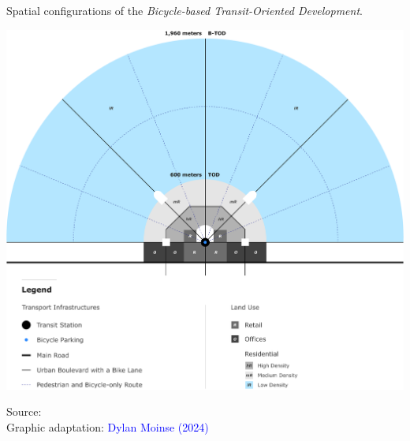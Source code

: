 \begin{refsegment}
\begin{carte}[h!]\vspace*{4pt}
    \caption{Spatial configurations of the \textsl{Bicycle-based Transit-Oriented Development}.}
    \label{fig-chap1:schema-b-tod}
    \centerline{\includegraphics[width=1\columnwidth]{src/Figures/Chap-1/EN_Schema_B_TOD.pdf}}
    \vspace{5pt}
    \begin{flushright}\scriptsize{
    Source: \textcolor{blue}{\textcite[979]{lee_bicycle-based_2016}}
    \\
    Graphic adaptation: \textcolor{blue}{Dylan Moinse (2024)}
    }\end{flushright}
\end{carte}


\end{refsegment}
